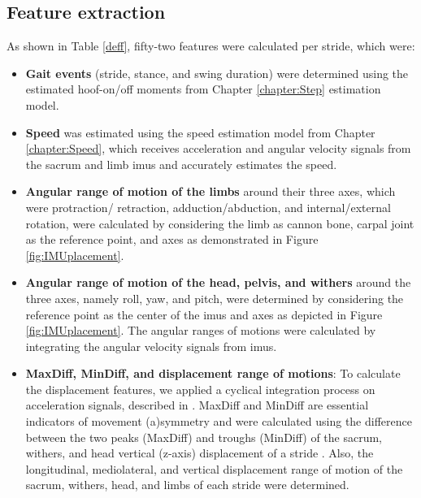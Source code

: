 \subsection{Feature extraction}

As shown in Table \ref{deff}, fifty-two features were calculated per stride, which were:

\begin{itemize} 

\item \textbf{Gait events} (stride, stance, and swing duration) were determined using the estimated hoof-on/off moments from Chapter \ref{chapter:Step} estimation model.

\item \textbf{Speed} was estimated using the speed estimation model from Chapter \ref{chapter:Speed}, which receives acceleration and angular velocity signals from the sacrum and limb \gls{imu}s and accurately estimates the speed. 

\item \textbf{Angular range of motion of the limbs} around their three axes, which were protraction/ retraction, adduction/abduction, and internal/external rotation, were calculated by considering the limb as cannon bone, carpal joint as the reference point, and axes as demonstrated in Figure \ref{fig:IMUplacement}. 

\item \textbf{Angular range of motion of the head, pelvis, and withers} around the three axes, namely roll, yaw, and pitch, were determined by considering the reference point as the center of the \gls{imu}s and axes as depicted in Figure \ref{fig:IMUplacement}. The angular ranges of motions were calculated by integrating the angular velocity signals from \gls{imu}s. 

\item \textbf{MaxDiff, MinDiff, and displacement range of motions}: To calculate the displacement features, we applied a cyclical integration process on acceleration signals, described in \cite{Pfau2013}. MaxDiff and MinDiff are essential indicators of movement (a)symmetry and were calculated using the difference between the two peaks (MaxDiff) and troughs (MinDiff) of the sacrum, withers, and head vertical (z-axis) displacement of a stride \cite{Kramer2004}. Also, the longitudinal, mediolateral, and vertical displacement range of motion of the sacrum, withers, head, and limbs of each stride were determined. 
\end{itemize} 


